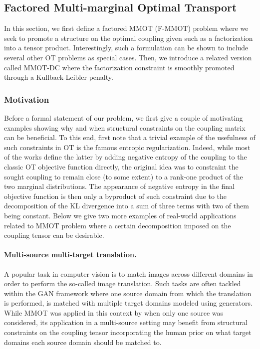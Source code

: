 \subsection{Factored Multi-marginal Optimal Transport}

In this section, we first define a factored MMOT (F-MMOT) problem where we seek to promote a structure on the optimal coupling
given such as a factorization into a tensor product. Interestingly, such a formulation can be shown to include several other
OT problems as special cases. Then, we introduce a relaxed version called MMOT-DC where the factorization constraint is
smoothly promoted through a Kullback-Leibler penalty.

\subsubsection{Motivation}

Before a formal statement of our problem, we first give a couple of motivating examples showing
why and when structural constraints on the coupling matrix can be beneficial. To this end,
first note that a trivial example of the usefulness of such constraints in OT is the famous
entropic regularization. Indeed, while most of the works define the latter by adding
negative entropy of the coupling to the classic OT objective function directly,
the original idea was to constraint the sought coupling to remain close (to some extent)
to a rank-one product of the two marginal distributions. The appearance of negative entropy
in the final objective function is then only a byproduct of such constraint due to
the decomposition of the KL divergence into a sum of three terms with two of them being constant.
Below we give two more examples of real-world applications related to MMOT problem
where a certain decomposition imposed on the coupling tensor can be desirable.

\paragraph{Multi-source multi-target translation.} A popular task in computer vision is
to match images across different domains in order to perform the so-called image translation.
Such tasks are often tackled within the GAN framework where one source domain from which
the translation is performed, is matched with multiple target domains modeled using generators.
While MMOT was applied in this context by \citet{Cao19} when only one source was considered,
its application in a multi-source setting may benefit from structural constraints
on the coupling tensor incorporating the human prior on what target domains each source domain
should be matched to.

